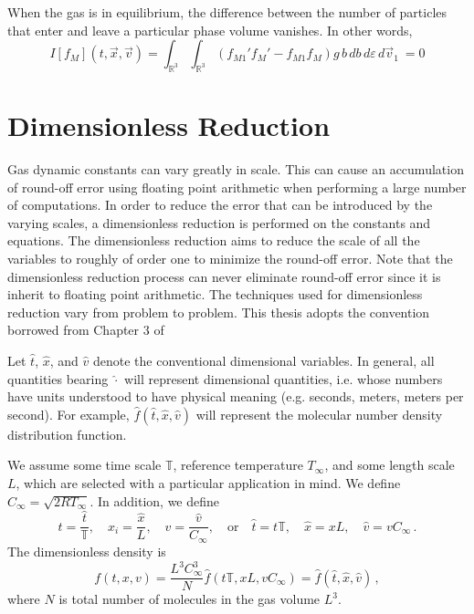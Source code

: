 \documentclass[12pt]{CSUNthesis}
\def\T{\mathbb{T}}
\def\R{\mathbb{R}}
\newcommand{\Tref}{T_{\infty}}
\newcommand{\Cref}{C_{\infty}}
\def\T{\mathbb{T}}
\def\R{\mathbb{R}}
\newcommand{\vecx}{\vec{x}}
\newcommand{\vecv}{\vec{v}}
\begin{document}
When the gas is in equilibrium, the difference between the number of particles that enter and leave a particular phase volume vanishes. In other words, 
\begin{equation*}
I[f_M](t,\vecx,\vecv) = \int_{\R^3} \int_{\R^3} (f_{M1}'f_M' - f_{M1} f_M)  g\, b\, db\, d\varepsilon\, d\vecv_1\ = 0
\end{equation*}


\section{Dimensionless Reduction}

Gas dynamic constants can vary greatly in scale. This can cause an accumulation of round-off error using floating point arithmetic when performing a large number of computations. In order to reduce the error that can be introduced by the varying scales, a dimensionless reduction is performed on the constants and equations. The dimensionless reduction aims to reduce the scale of all the variables to roughly of order one to minimize the round-off error. Note that the dimensionless reduction process can never eliminate round-off error since it is inherit to floating point arithmetic. The techniques used for dimensionless reduction vary from problem to problem. This thesis adopts the convention borrowed from Chapter 3 of \cite{Golse2006}

Let $\hat{t}$, $\hat{x}$, and $\hat{v}$ denote the conventional dimensional variables. In general, all quantities bearing $\hat{\cdot}$ will represent dimensional quantities, i.e. whose numbers have units understood to have physical meaning (e.g. seconds, meters, meters per second). For example, $\hat{f}(\hat{t},\hat{x},\hat{v})$ will represent the molecular number density distribution function.

We assume some time scale $\mathbb{T}$, reference temperature $\Tref$, and some length scale $L$, which are selected with a particular application in mind. We define $\Cref = \sqrt{2R\Tref}$. In addition, we define
\begin{equation}
\label{eq:new_dimless}
t=\frac{\hat{t}}{\T},
\quad x_{i}=\frac{\hat{x}}{L},
\quad v=\frac{\hat{v}}{C_{\infty}}, 
\quad \mbox{or}
\quad \hat{t}=t\T,
\quad \hat{x}=x L,
\quad \hat{v}=vC_{\infty}\, .
\end{equation}
The dimensionless density is
\begin{equation}
f(t,x,v) = \frac{L^3 \Cref^3}{N} \hat{f}(t\mathbb{T},xL, v\Cref) = \hat{f}(\hat{t},\hat{x},\hat{v})\, ,
\end{equation}
where $N$ is total number of molecules in the gas volume $L^3$. 
\end{document}
